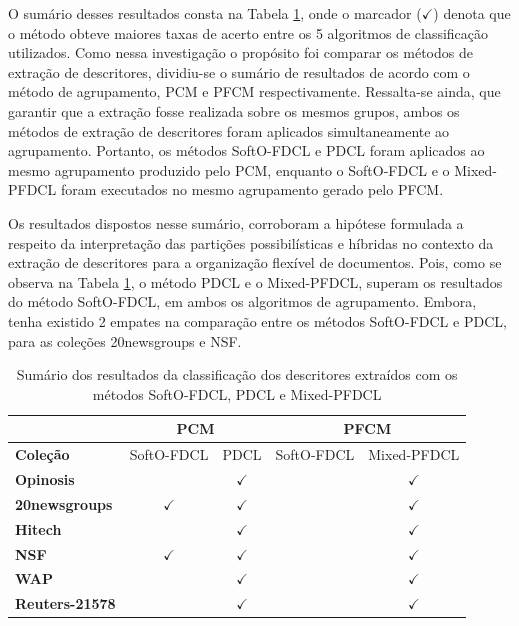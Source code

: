 O sumário desses resultados consta na Tabela \ref{table:pdclsummary}, onde o marcador ($\checkmark$)
denota que o método obteve maiores taxas de acerto entre os 5 algoritmos de classificação
utilizados. Como nessa investigação o propósito foi comparar os métodos de extração de descritores,
dividiu-se o sumário de resultados de acordo com o método de agrupamento, PCM e PFCM
respectivamente. Ressalta-se ainda, que garantir que a extração fosse realizada sobre os mesmos
grupos, ambos os
métodos de extração de descritores foram aplicados simultaneamente ao agrupamento. Portanto, os
métodos SoftO-FDCL e PDCL foram aplicados ao mesmo agrupamento produzido pelo PCM, enquanto o
SoftO-FDCL e o Mixed-PFDCL foram executados no mesmo agrupamento gerado pelo PFCM. 

Os resultados dispostos nesse sumário, corroboram a hipótese formulada a respeito da interpretação
das partições possibilísticas e híbridas no contexto da extração de descritores para a organização
flexível de documentos. Pois, como se observa na Tabela \ref{table:pdclsummary}, o método PDCL e o
Mixed-PFDCL, superam os resultados do método SoftO-FDCL, em ambos os algoritmos de agrupamento.
Embora, tenha existido 2 empates na comparação entre os métodos SoftO-FDCL e PDCL, para as coleções
20newsgroups e NSF.

\begin{table}[!htp]
  \centering
  \begin{tabular}{|l|c c|c c|}
    \hline
    & \multicolumn{2}{c|}{PCM} & \multicolumn{2}{c|}{PFCM} \\
    \hline
    {\bf Coleção} & SoftO-FDCL & PDCL & SoftO-FDCL & Mixed-PFDCL \\
    \hline
    {\bf Opinosis} & & $\checkmark$ & & $\checkmark$ \\
    \hline
    {\bf 20newsgroups} & $\checkmark$ & $\checkmark$ & & $\checkmark$\\
    \hline
    {\bf Hitech} & & $\checkmark$ & & $\checkmark$ \\
    \hline
    {\bf NSF} &  $\checkmark$ & $\checkmark$ & & $\checkmark$\\
    \hline
    {\bf WAP} & & $\checkmark$ & & $\checkmark$\\
    \hline
    {\bf Reuters-21578} & & $\checkmark$ & & $\checkmark$\\
    \hline
  \end{tabular}
  \caption{Sumário dos resultados da classificação dos descritores extraídos com os métodos
  SoftO-FDCL, PDCL e Mixed-PFDCL}
  \label{table:pdclsummary}
\end{table}


